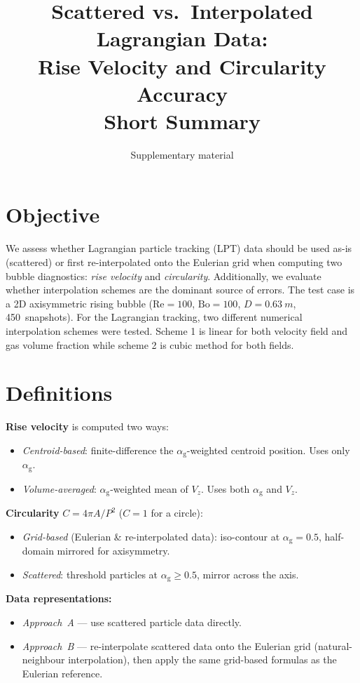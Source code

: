 \documentclass[11pt,a4paper]{article}
\title{Scattered vs.\ Interpolated Lagrangian Data:\\[2pt]
  Rise Velocity and Circularity Accuracy\\[6pt]
  \large Short Summary}
\author{Supplementary material}
\date{}
\newcommand{\alphag}{\alpha_{\mathrm{g}}}
\newcommand{\Vz}{V_z}
\begin{document}
\maketitle

\section{Objective}

We assess whether Lagrangian particle tracking (LPT) data should be used
as-is (scattered) or first re-interpolated onto the Eulerian grid when
computing two bubble diagnostics: \emph{rise velocity} and
\emph{circularity}.  Additionally, we evaluate whether interpolation schemes are the dominant source of errors. The test case is a 2D axisymmetric rising bubble
($\mathrm{Re}=100$, $\mathrm{Bo}=100$, $D=\SI{0.63}{m}$, 450~snapshots). For the Lagrangian tracking, two different numerical interpolation schemes were tested. Scheme 1 is linear for both velocity field and gas volume fraction while scheme 2 is cubic method for both fields.


\section{Definitions}

\textbf{Rise velocity} is computed two ways:
\begin{itemize}[nosep]
  \item \emph{Centroid-based}: finite-difference the $\alphag$-weighted
    centroid position. Uses only $\alphag$.
  \item \emph{Volume-averaged}: $\alphag$-weighted mean of $\Vz$. Uses
    both $\alphag$ and $\Vz$.
\end{itemize}

\textbf{Circularity} $C = 4\pi A / P^{2}$ ($C=1$ for a circle):
\begin{itemize}[nosep]
  \item \emph{Grid-based} (Eulerian \& re-interpolated data): iso-contour
    at $\alphag = 0.5$, half-domain mirrored for axisymmetry.
  \item \emph{Scattered}: threshold particles at $\alphag \ge 0.5$, mirror
    across the axis.
\end{itemize}

\textbf{Data representations:}
\begin{itemize}[nosep]
  \item \emph{Approach~A} --- use scattered particle data directly.
  \item \emph{Approach~B} --- re-interpolate scattered data onto the
    Eulerian grid (natural-neighbour interpolation), then apply the same
    grid-based formulas as the Eulerian reference.
\end{itemize}
\end{document}
